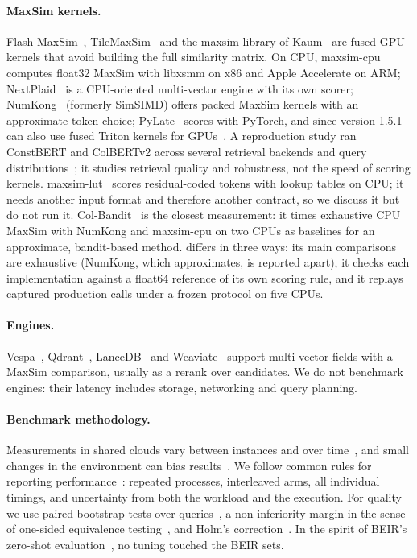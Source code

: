 \paragraph{MaxSim kernels.}
Flash-MaxSim~\cite{pony2026flashmaxsim}, TileMaxSim~\cite{sharma2026tilemaxsim} and the maxsim library of Kaum~\cite{kaum2026maxsim} are fused GPU kernels that avoid building the full similarity matrix.
On CPU, maxsim-cpu~\cite{clavie2025maxsimcpu} computes float32 MaxSim with libxsmm on x86 and Apple Accelerate on ARM; NextPlaid~\cite{lightonai2026nextplaid} is a CPU-oriented multi-vector engine with its own scorer; NumKong~\cite{vardanian2026numkong} (formerly SimSIMD) offers packed MaxSim kernels with an approximate token choice; PyLate~\cite{chaffin2025pylatecikm} scores with PyTorch, and since version 1.5.1 can also use fused Triton kernels for GPUs~\cite{hcompai_lik}.
A reproduction study ran ConstBERT and ColBERTv2 across several retrieval backends and query distributions~\cite{ghosh2026reproduction}; it studies retrieval quality and robustness, not the speed of scoring kernels.
maxsim-lut~\cite{joe32140maxsimlut} scores residual-coded tokens with lookup tables on CPU; it needs another input format and therefore another contract, so we discuss it but do not run it.
Col-Bandit~\cite{pony2026colbandit} is the closest measurement: it times exhaustive CPU MaxSim with NumKong and maxsim-cpu on two CPUs as baselines for an approximate, bandit-based method.
\benchname differs in three ways: its main comparisons are exhaustive (NumKong, which approximates, is reported apart), it checks each implementation against a float64 reference of its own scoring rule, and it replays captured production calls under a frozen protocol on five CPUs.

\paragraph{Engines.}
Vespa~\cite{bergum2024vespacolbert}, Qdrant~\cite{qdrant2026multivector}, LanceDB~\cite{lancedb2026multivector} and Weaviate~\cite{weaviate2026multivector} support multi-vector fields with a MaxSim comparison, usually as a rerank over candidates.
We do not benchmark engines: their latency includes storage, networking and query planning.

\paragraph{Benchmark methodology.}
Measurements in shared clouds vary between instances and over time~\cite{leitner2016patterns,uta2020bigdata}, and small changes in the environment can bias results~\cite{mytkowicz2009wrongdata}.
We follow common rules for reporting performance~\cite{hoefler2015scientific}: repeated processes, interleaved arms, all individual timings, and uncertainty from both the workload and the execution.
For quality we use paired bootstrap tests over queries~\cite{sakai2006bootstrap,efron1993bootstrap}, a non-inferiority margin in the sense of one-sided equivalence testing~\cite{schuirmann1987tost}, and Holm's correction~\cite{holm1979simple}.
In the spirit of BEIR's zero-shot evaluation~\cite{thakur2021beir}, no tuning touched the BEIR sets.
